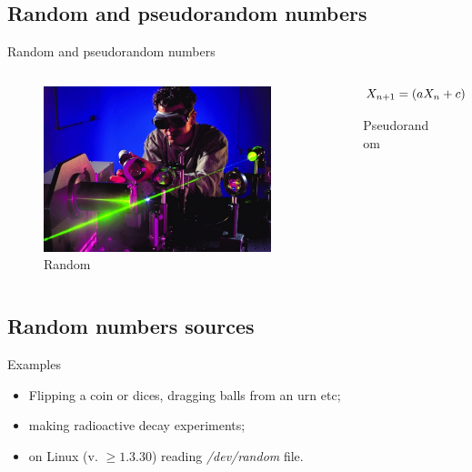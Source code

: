 \documentclass[12pt]{beamer}
\begin{document}
\subsection{Random and pseudorandom numbers}
\begin{frame}{Random and pseudorandom numbers}
\begin{columns}
 \begin{column}{5cm}
 \begin{figure}
\includegraphics[scale=0.3]{RandExper.jpg} 
\caption{Random}
\end{figure} 
 \end{column}
 \begin{column}{6cm}
 \newline
 \newline
 
\begin{figure}
   $$X_{n+1} = \left(a X_{n} + c\right) \mod m$$
\caption{ Pseudorandom}
\end{figure}
\end{column}


\end{columns}
 \end{frame}
 
 
  
 \subsection{Random numbers sources}
 \begin{frame}{Examples}
 \begin{itemize}
  \item Flipping a coin or dices, dragging balls from an urn etc; 
  \pause
  \item making radioactive decay experiments;
  \pause
  \item on Linux (v. $\geqslant 1.3.30$) reading \textit{/dev/random} file.
 \end{itemize}
 \end{frame}
 
\end{document}
